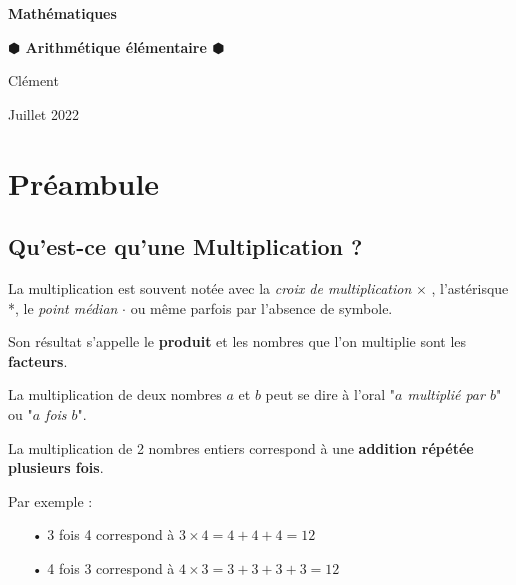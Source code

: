 \documentclass[a4paper]{article}
\begin{document}
	\begin{titlepage}
		\begin{center}
		
\Huge  		\textbf{Mathématiques}\\
		\bigskip \smallskip
		
\Large		\textbf{$\varhexagonblack$ Arithmétique élémentaire $\varhexagonblack$}\\
		\bigskip
		
\large		Clément   \\ 
		\smallskip
		
\normalfont	Juillet 2022\\
		
		\end{center}
		
\doublespacing
\tableofcontents
\singlespacing

	\end{titlepage}







\section{Préambule}

\subsection*{Qu'est-ce qu'une Multiplication ?}

	La multiplication est souvent notée avec la \textit{croix de multiplication} $\times$ , l'astérisque *, le \textit{point médian} $\cdot$ ou même parfois par l'absence de symbole.
	
	Son résultat s'appelle le \textbf{produit} et les nombres que l'on multiplie sont les \textbf{facteurs}.

	La multiplication de deux nombres $a$ et $b$ peut se dire à l'oral "\textit{$a$ multiplié par $b$}" ou "\textit{$a$ fois $b$}".\\
	
\vspace{-2 mm}

	La multiplication de 2 nombres entiers correspond à une \textbf{addition répétée plusieurs fois}.

{\noindent Par exemple :}

	\begin{itemize}
	\onehalfspacing
	\item[•] 3 fois 4 correspond à $3 \times 4 = 4 + 4 + 4 = 12$
	\item[•] 4 fois 3 correspond à $4 \times 3 = 3 + 3 + 3 + 3 = 12$
	
	\end{itemize}
\singlespacing
\vspace{-2 mm}
\end{document}
